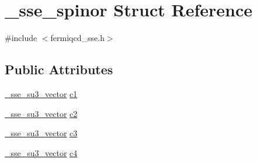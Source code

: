 \hypertarget{struct__sse__spinor}{
\section{\_\-sse\_\-spinor Struct Reference}
\label{struct__sse__spinor}
}


{\ttfamily \#include $<$fermiqcd\_\-sse.h$>$}\subsection*{Public Attributes}
\begin{DoxyCompactItemize}
\item 
\hyperlink{struct__sse__su3__vector}{\_\-sse\_\-su3\_\-vector} \hyperlink{struct__sse__spinor_ae6cee2a3ca115d5caca71964f07c0a9d}{c1}
\item 
\hyperlink{struct__sse__su3__vector}{\_\-sse\_\-su3\_\-vector} \hyperlink{struct__sse__spinor_aea347e088a3466b83e4507700b9e0fad}{c2}
\item 
\hyperlink{struct__sse__su3__vector}{\_\-sse\_\-su3\_\-vector} \hyperlink{struct__sse__spinor_aa7d9a43ed29e45e59cb7d9ac94bc0dd8}{c3}
\item 
\hyperlink{struct__sse__su3__vector}{\_\-sse\_\-su3\_\-vector} \hyperlink{struct__sse__spinor_ae0f9c8736250608d862d3d5a5757dbc7}{c4}
\end{DoxyCompactItemize}


